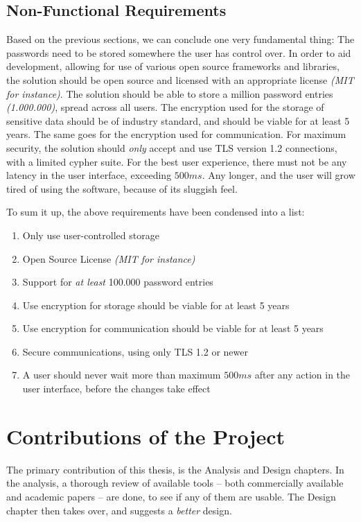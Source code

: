 		\subsection*{Non-Functional Requirements}
			Based on the previous sections, we can conclude one very fundamental thing: The passwords need to be stored somewhere the user has control over. In order to aid development, allowing for use of various open source frameworks and libraries, the solution should be open source and licensed with an appropriate license \emph{(MIT for instance)}. The solution should be able to store a million password entries \emph{(1.000.000)}, spread across all users. The encryption used for the storage of sensitive data should be of industry standard, and should be viable for at least 5 years. The same goes for the encryption used for communication. For maximum security, the solution should \emph{only} accept and use TLS version 1.2 connections, with a limited cypher suite. For the best user experience, there must not be any latency in the user interface, exceeding $500ms$. Any longer, and the user will grow tired of using the software, because of its sluggish feel.

			To sum it up, the above requirements have been condensed into a list:
			\vspace{-3ex}\begin{enumerate}
				\setlength\itemsep{0.1em}
				\item Only use user-controlled storage \label{requirement:user_storage}
				\item Open Source License \emph{(MIT for instance)} \label{requirement:open-source}
				\item Support for \emph{at least} 100.000 password entries \label{requirement:entries}
				\item Use encryption for storage should be viable for at least 5 years \label{requirement:encryption}
				\item Use encryption for communication should be viable for at least 5 years \label{requirement:comms}
				\item Secure communications, using only TLS 1.2 or newer \label{requirement:tls1.2}
				\item A user should never wait more than maximum $500ms$ after any action in the user interface, before the changes take effect \label{requirement:delay}
			\end{enumerate}

	\section{Contributions of the Project}
		The primary contribution of this thesis, is the Analysis and Design chapters. In the analysis, a thorough review of available tools -- both commercially available and academic papers -- are done, to see if any of them are usable. The Design chapter then takes over, and suggests a \emph{better} design.

